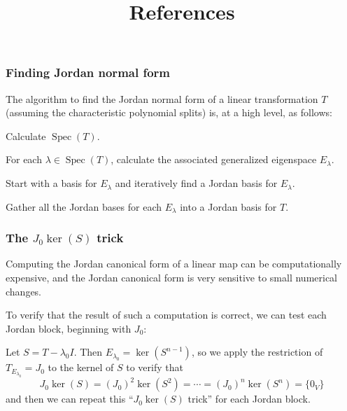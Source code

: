 \documentclass{beamer}
\DeclareMathOperator{\Spec}{Spec}
\theoremstyle{definition}
\begin{document}
\begin{frame}
    \frametitle{Finding Jordan normal form}

    The algorithm to find the Jordan normal form of a linear transformation $T$ (assuming the characteristic polynomial splits) is, at a high level, as follows:

    \pause
    Calculate $\Spec(T)$.

    \pause
    For each $\lambda \in \Spec(T)$, calculate the associated generalized eigenspace $E_\lambda$.

    \pause
    Start with a basis for $E_\lambda$ and iteratively find a Jordan basis for $E_\lambda$.

    \pause
    Gather all the Jordan bases for each $E_\lambda$ into a Jordan basis for $T$.
\end{frame}

\begin{frame}
    \frametitle{The $J_0 \ker(S)$ trick}
    
    Computing the Jordan canonical form of a linear map can be computationally expensive, and the Jordan canonical form is very sensitive
    to small numerical changes.

    \pause
    To verify that the result of such a computation is correct, we can test each Jordan block, beginning with $J_0$:

    \pause
    Let $S = T - \lambda_0 I$. Then $E_{\lambda_0} = \ker(S^{n-1})$, so we apply the restriction of $T_{E_{\lambda_0}} = J_0$ to the kernel of $S$
    to verify that
    \[
        J_0 \ker(S) = (J_0)^2 \ker(S^2) = \cdots = (J_0)^n \ker(S^n) = \{0_V\}
    \]
    and then we can repeat this ``$J_0 \ker(S)$ trick'' for each Jordan block.
\end{frame}

\begin{frame}
    \title{References}
    \printbibliography
\end{frame}
\end{document}
